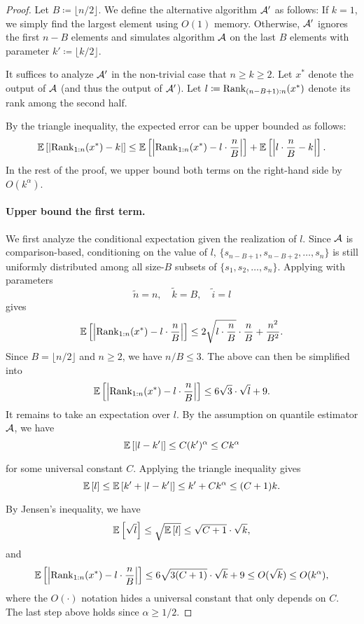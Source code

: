 \begin{proof}
    Let $B \coloneqq \lfloor n / 2\rfloor$. We define the alternative algorithm $\mathcal{A}'$ as follows: If $k = 1$, we simply find the largest element using $O(1)$ memory. Otherwise, $\mathcal{A}'$ ignores the first $n - B$ elements and simulates algorithm $\mathcal{A}$ on the last $B$ elements with parameter $k' \coloneqq \lfloor k/2\rfloor$.

    It suffices to analyze $\mathcal{A}'$ in the non-trivial case that $n \ge k \ge 2$. Let $x^*$ denote the output of $\mathcal{A}$ (and thus the output of $\mathcal{A}'$). Let $l \coloneqq \mathrm{Rank}_{(n-B+1):n}(x^*)$ denote its rank among the second half.

    By the triangle inequality, the expected error can be upper bounded as follows:
    \[
        \operatorname*{\mathbb{E}}_{}\left[|\mathrm{Rank}_{1:n}(x^*) - k|\right]
    \le \operatorname*{\mathbb{E}}_{}\left[\left|\mathrm{Rank}_{1:n}(x^*) - l \cdot \frac{n}{B}\right|\right] + \operatorname*{\mathbb{E}}_{}\left[\left|l \cdot \frac{n}{B} - k\right|\right].
    \]
    In the rest of the proof, we upper bound both terms on the right-hand side by $O(k^{\alpha})$.

    \paragraph{Upper bound the first term.} We first analyze the conditional expectation given the realization of $l$. Since $\mathcal{A}$ is comparison-based, conditioning on the value of $l$, $\{s_{n-B+1}, s_{n-B+2}, \ldots, s_n\}$ is still uniformly distributed among all size-$B$ subsets of $\{s_1, s_2, \ldots, s_n\}$. Applying  with parameters
    \[
        \tilde n = n, \quad \tilde k = B, \quad \tilde i = l
    \]
    gives
    \[
        \operatorname*{\mathbb{E}}_{}\left[\left|\mathrm{Rank}_{1:n}(x^*) - l \cdot \frac{n}{B}\right|\right]
    \le 2\sqrt{l \cdot \frac{n}{B}}\cdot\frac{n}{B} + \frac{n^2}{B^2}.
    \]
    Since $B = \lfloor n / 2\rfloor$ and $n \ge 2$, we have $n / B \le 3$. The above can then be simplified into
    \[
        \operatorname*{\mathbb{E}}_{}\left[\left|\mathrm{Rank}_{1:n}(x^*) - l \cdot \frac{n}{B}\right|\right]
    \le 6\sqrt{3}\cdot\sqrt{l} + 9.
    \]
    It remains to take an expectation over $l$. By the assumption on quantile estimator $\mathcal{A}$, we have
    \begin{equation}\label{eq:l-minus-k-prime-upper-bound}
        \operatorname*{\mathbb{E}}_{}\left[|l - k'|\right] \le C(k')^{\alpha} \le Ck^{\alpha}
    \end{equation}
    for some universal constant $C$. Applying the triangle inequality gives
    \begin{equation}\label{eq:l-upper-bound}
        \operatorname*{\mathbb{E}}_{}\left[l\right]
    \le \operatorname*{\mathbb{E}}_{}\left[k' + |l - k'|\right]
    \le k' + Ck^{\alpha}
    \le (C + 1)k.
    \end{equation}
    By Jensen's inequality, we have
    \[
        \operatorname*{\mathbb{E}}_{}\left[\sqrt{l}\right]
    \le \sqrt{\operatorname*{\mathbb{E}}_{}\left[l\right]}
    \le \sqrt{C + 1}\cdot\sqrt{k},
    \]
    and
    \[
        \operatorname*{\mathbb{E}}_{}\left[\left|\mathrm{Rank}_{1:n}(x^*) - l \cdot \frac{n}{B}\right|\right]
    \le 6\sqrt{3(C+1)}\cdot\sqrt{k} + 9
    \le O(\sqrt{k})
    \le O(k^{\alpha}),
    \]
    where the $O(\cdot)$ notation hides a universal constant that only depends on $C$. The last step above holds since $\alpha \ge 1/2$.


\end{proof}
